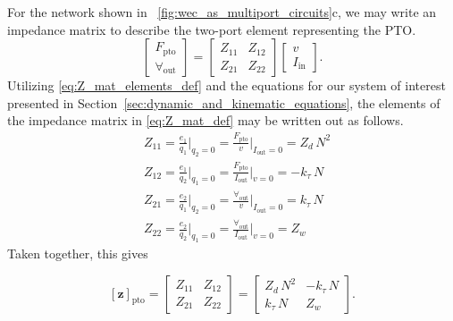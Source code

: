 \documentclass[lettersize,journal]{IEEEtran}
\begin{document}
For the network shown in \figurename~\ref{fig:wec_as_multiport_circuits}c, we may write an impedance matrix to describe the two-port element representing the PTO.
%
\begin{equation}
        \label{eq:Z_mat_def}
        \begin{bmatrix} 
                F_{\textrm{pto}} \\
                \forall_{\textrm{out}} 
        \end{bmatrix} 
        = 
        \begin{bmatrix} 
                Z_{11} & Z_{12} \\ 
                Z_{21} & Z_{22} 
        \end{bmatrix} 
        \begin{bmatrix} 
                v \\
                I_{\textrm{in}} 
        \end{bmatrix}.
\end{equation}
%
Utilizing \eqref{eq:Z_mat_elements_def} and the equations for our system of interest presented in Section~\ref{sec:dynamic_and_kinematic_equations}, the elements of the impedance matrix in \eqref{eq:Z_mat_def} may be written out as follows.
%
\begin{subequations}
        \begin{align}
                &Z_{11} = \frac{e_1}{q_1} \bigg \vert_{q_2=0} 
                = \frac{F_{\textrm{pto}}}{v} \bigg \vert_{I_{\textrm{out}}=0} = Z_d \, N^2 \\[0.5em]
                &Z_{12} = \frac{e_1}{q_2} \bigg \vert_{q_1=0} 
                = \frac{F_{\textrm{pto}}}{I_{\textrm{out}}} \bigg \vert_{v=0} = -k_\tau \, N \\[0.5em]
                &Z_{21} = \frac{e_2}{q_1} \bigg \vert_{q_2=0} 
                = \frac{\forall_{\textrm{out}}}{v} \bigg \vert_{I_{\textrm{out}}=0} = k_\tau \, N \\[0.5em]
                &Z_{22} = \frac{e_2}{q_2} \bigg \vert_{q_1=0} 
                = \frac{\forall_{\textrm{out}}}{I_{\textrm{out}}} \bigg \vert_{v=0} = Z_w 
        \end{align}
\end{subequations}
%
Taken together, this gives 

\begin{equation}
        \left[ \mathbf{z} \right]_{\textrm{pto}} 
        = 
        \begin{bmatrix} 
                Z_{11} & Z_{12} \\ 
                Z_{21} & Z_{22} 
        \end{bmatrix}
        =
        \begin{bmatrix} 
        Z_d \, N^2      & -k_\tau \, N  \\
        k_\tau \, N     & Z_w
        \end{bmatrix}.
        \label{eq:pto_impedance}
\end{equation}
\end{document}

